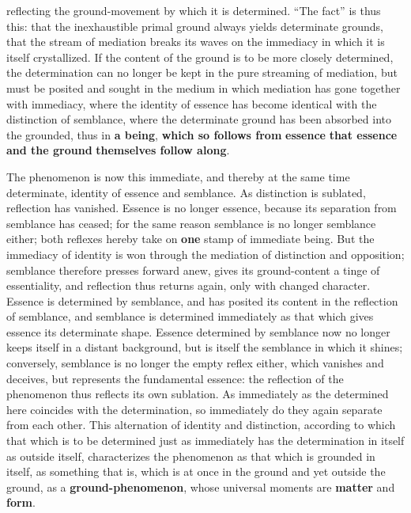 \documentclass[12pt,a4paper,openany]{book}
\newcommand{\opage}[1]{\marginnote{\footnotesize\textit{[#1]}}}
\begin{document}
reflecting the ground-movement by which it is determined.
``The fact'' is thus this: that the inexhaustible primal ground
always yields determinate grounds, that the stream of mediation
breaks its waves on the immediacy in which
it is itself crystallized. If the content of the ground is to be
more closely determined, the determination can no longer
be kept in the pure streaming of mediation, but must be posited
and sought in the medium in which mediation has gone
together with immediacy, where the identity of essence
has become identical with the distinction of semblance, where the
determinate ground has been absorbed into the grounded, thus
in \textbf{a being}, \textbf{which so follows from} \textbf{essence}
\textbf{that essence and the ground} \textbf{themselves follow along}.

The phenomenon is now this immediate, and thereby at the same time
determinate, identity of essence and semblance. As distinction
is sublated, reflection has vanished. Essence
is no longer essence, because its separation from
semblance has ceased; for the same reason semblance is no longer
semblance either; both reflexes hereby take on \textbf{one}
\setcounter{footnote}{0}%
\opage{144}stamp of immediate being. But the immediacy of identity
is won through the mediation of distinction and opposition;
semblance therefore presses forward
anew, gives its ground-content a tinge of essentiality,
and reflection thus returns again, only
with changed character. Essence is determined by semblance,
and has posited its content in the reflection of semblance, and
semblance is determined immediately as that which gives
essence its determinate shape. Essence determined by semblance
now no longer keeps itself in a distant
background, but is itself the semblance in which it shines;
conversely, semblance is no longer the empty reflex either,
which vanishes and deceives, but represents the fundamental
essence: the reflection of the phenomenon thus reflects its
own sublation. As immediately as the determined
here coincides with the determination, so immediately
do they again separate from each other. This alternation of
identity and distinction, according to which that which is to be determined
just as immediately has the determination in itself
as outside itself, characterizes the phenomenon as that which is grounded
in itself, as something that is, which is at once in
the ground and yet outside the ground, as a \textbf{ground-phenomenon}, whose universal moments are \textbf{matter} and
\textbf{form}.
\end{document}
